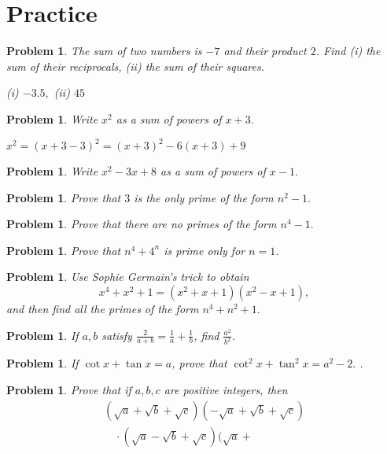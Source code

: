 \documentclass[11pt, openany]{book}
\theoremstyle{change} \theoremheaderfont{\blue\sffamily\bfseries}
\newtheorem{pro}[thm]{Problem}
\theoremstyle{nonumberplain} \theoremheaderfont{\sffamily\bfseries}
\newcommand{\dis}{\displaystyle}
\newcommand{\í}{\'{\i}}
\begin{document}
\section*{Practice}\begin{multicols}{2}\columnseprule 1pt \columnsep 25pt

\begin{pro} The sum of two numbers is $-7$ and their product $2$. Find (i) the sum of their
reciprocals, (ii) the sum of their squares.
\begin{answer}
(i) $-3.5,$ (ii) $45$
\end{answer}
\end{pro}
\begin{pro}
Write $x^2$ as a sum of  powers of $x + 3.$
\begin{answer}
$x^2 = (x + 3 - 3)^2 = (x + 3)^2 - 6(x + 3) + 9$
\end{answer}
\end{pro}
\begin{pro}
Write $x^2 - 3x + 8$ as a sum of  powers of $x - 1.$
\end{pro}
\begin{pro}
Prove that $3$ is the only prime of the form $n^2 - 1.$
\end{pro}
\begin{pro}
Prove that there are no primes of the form $n^4 - 1.$
\end{pro}
\begin{pro} Prove that $n^4 + 4^n$ is prime only for $n = 1$.
\end{pro}
\begin{pro}
Use Sophie Germain's trick to obtain $$x^4 + x^2 + 1 = (x^2 + x +
1)(x^2 - x + 1),$$ and then find all the primes of the form $n^4 +
n^2 + 1.$
\end{pro}
\begin{pro}
If $a, b$ satisfy $\frac{2}{a + b} = \frac{1}{a} + \frac{1}{b}$,
find $\dis{\frac{a^2}{b^2}}$.
\end{pro}
\begin{pro}
If $\cot x + \tan x = a$, prove that $\cot ^2x + \tan ^2x = a^2 -
2.$ .
\end{pro}
\begin{pro}Prove that if $a, b, c$ are positive integers, then
$$\begin{array}{l}(\sqrt{a} + \sqrt{b} + \sqrt{c})(-\sqrt{a} + \sqrt{b} +
\sqrt{c})\\\quad\cdot (\sqrt{a} - \sqrt{b} + \sqrt{c}) (\sqrt{a} +

\end{array}$$
\end{pro}
\end{multicols}
\end{document}
